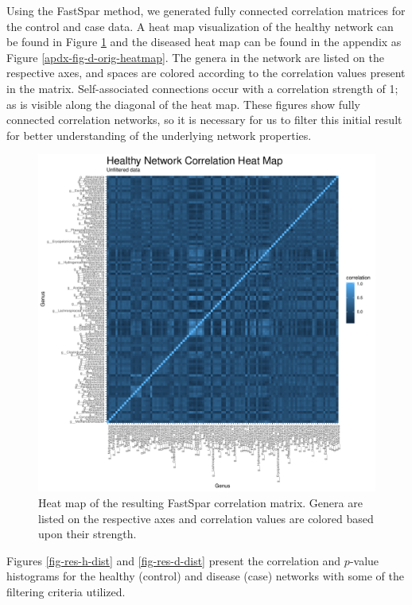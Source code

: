 Using the \acrshort{FastSpar} method, we generated fully connected correlation matrices for the control and case data. A heat map visualization of the healthy network can be found in Figure \ref{fig-h-orig-heatmap} and the diseased heat map can be found in the appendix as Figure \ref{apdx-fig-d-orig-heatmap}. The genera in the network are listed on the respective axes, and spaces are colored according to the correlation values present in the matrix. Self-associated connections occur with a correlation strength of 1; as is visible along the diagonal of the heat map. These figures show fully connected correlation networks, so it is necessary for us to filter this initial result for better understanding of the underlying network properties.
\begin{figure}[!htb]
    \centering
    \includegraphics[width=1.0\linewidth]{figure/results/healthy_raw_corr_heatmap.pdf}
    \caption[Heat map of the resulting \acrshort{FastSpar} correlation matrix.]{Heat map of the resulting \acrshort{FastSpar} correlation matrix. Genera are listed on the respective axes and correlation values are colored based upon their strength.}
    \label{fig-h-orig-heatmap}
\end{figure}
 Figures \ref{fig-res-h-dist} and \ref{fig-res-d-dist} present the correlation and $p$-value histograms for the healthy (control) and disease (case) networks with some of the filtering criteria utilized.

